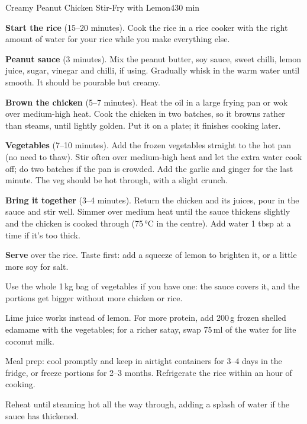 \begin{recipebox}{Creamy Peanut Chicken Stir-Fry with Lemon}{4}{30 min}
\begin{method}
  \item \textbf{Start the rice} (15--20 minutes). Cook the rice in a rice cooker
        with the right amount of water for your rice while you make everything
        else.
  \item \textbf{Peanut sauce} (3 minutes). Mix the peanut butter, soy sauce, sweet
        chilli, lemon juice, sugar, vinegar and chilli, if using. Gradually whisk
        in the warm water until smooth. It should be pourable but creamy.
  \item \textbf{Brown the chicken} (5--7 minutes). Heat the oil in a large frying
        pan or wok over medium-high heat. Cook the chicken in two batches, so it
        browns rather than steams, until lightly golden. Put it on a plate; it
        finishes cooking later.
  \item \textbf{Vegetables} (7--10 minutes). Add the frozen vegetables straight to
        the hot pan (no need to thaw). Stir often over medium-high heat and let
        the extra water cook off; do two batches if the pan is crowded. Add the
        garlic and ginger for the last minute. The veg should be hot through,
        with a slight crunch.
  \item \textbf{Bring it together} (3--4 minutes). Return the chicken and its juices,
        pour in the sauce and stir well. Simmer over medium heat until the sauce
        thickens slightly and the chicken is cooked through (75\,°C in the
        centre). Add water 1 tbsp at a time if it's too thick.
  \item \textbf{Serve} over the rice. Taste first: add a squeeze of lemon to
        brighten it, or a little more soy for salt.
\end{method}

\begin{notelist}
  \item Use the whole 1\,kg bag of vegetables if you have one: the sauce covers it,
        and the portions get bigger without more chicken or rice.
  \item Lime juice works instead of lemon. For more protein, add 200\,g frozen
        shelled edamame with the vegetables; for a richer satay, swap 75\,ml of the
        water for lite coconut milk.
  \item Meal prep: cool promptly and keep in airtight containers for 3--4 days in
        the fridge, or freeze portions for 2--3 months. Refrigerate the rice
        within an hour of cooking.
  \item Reheat until steaming hot all the way through, adding a splash of water if
        the sauce has thickened.
\end{notelist}

\end{recipebox}
